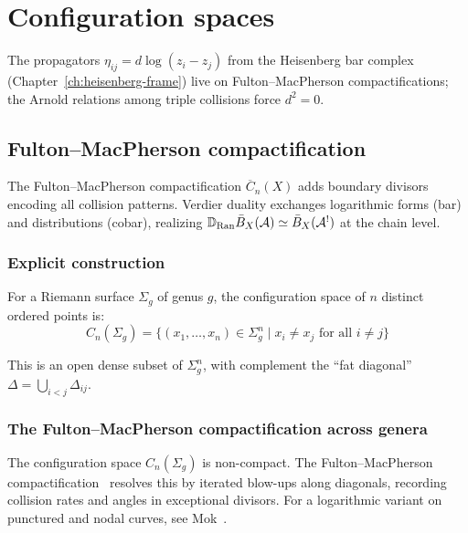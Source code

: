 \chapter{Configuration spaces}
\label{chap:config-spaces}


The propagators $\eta_{ij} = d\log(z_i - z_j)$ from the Heisenberg bar complex (Chapter~\ref{ch:heisenberg-frame}) live on Fulton--MacPherson compactifications; the Arnold relations among triple collisions force $d^2 = 0$.

\section{Fulton--MacPherson compactification}
\label{sec:FM-compactification}

The Fulton--MacPherson compactification $\overline{C}_n(X)$ adds
boundary divisors encoding all collision patterns.  Verdier duality exchanges logarithmic forms
(bar) and distributions (cobar), realizing
$\mathbb{D}_{\operatorname{Ran}} \bar{B}_X(\mathcal{A}) \simeq
\bar{B}_X(\mathcal{A}^!)$ at the chain level.

\subsection{Explicit construction}

\begin{definition}\label{def:config-space-genus-g}
For a Riemann surface $\Sigma_g$ of genus $g$, the configuration space of $n$ distinct ordered points is:
\[C_n(\Sigma_g) = \{(x_1, \ldots, x_n) \in \Sigma_g^n \mid x_i \neq x_j \text{ for all } i \neq j\}\]

This is an open dense subset of $\Sigma_g^n$, with complement the ``fat diagonal'' $\Delta = \bigcup_{i<j} \Delta_{ij}$.
\end{definition}

\subsection{The Fulton--MacPherson compactification across genera}

The configuration space $C_n(\Sigma_g)$ is non-compact.  The Fulton--MacPherson compactification~\cite{FM94} resolves this by iterated blow-ups along diagonals, recording collision rates and angles in exceptional divisors. For a logarithmic variant on punctured and nodal curves, see Mok~\cite{Mok25}.

